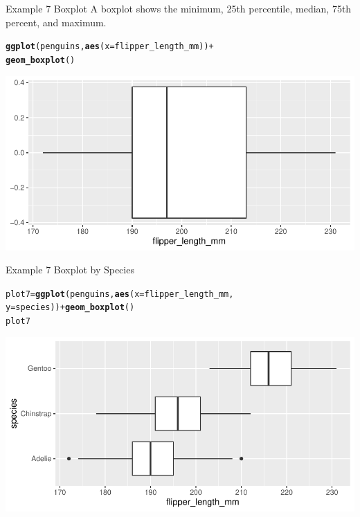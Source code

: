 \documentclass{beamer}\usepackage[]{graphicx}\usepackage[]{color}
\makeatletter
\newcommand{\hlopt}[1]{\textcolor[rgb]{0,0,0}{#1}}%
\newcommand{\hlstd}[1]{\textcolor[rgb]{0.345,0.345,0.345}{#1}}%
\newcommand{\hlkwb}[1]{\textcolor[rgb]{0.69,0.353,0.396}{#1}}%
\newcommand{\hlkwc}[1]{\textcolor[rgb]{0.333,0.667,0.333}{#1}}%
\newcommand{\hlkwd}[1]{\textcolor[rgb]{0.737,0.353,0.396}{\textbf{#1}}}%
\newenvironment{kframe}{%
 \def\at@end@of@kframe{}%
 \ifinner\ifhmode%
  \def\at@end@of@kframe{\end{minipage}}%
  \begin{minipage}{\columnwidth}%
 \fi\fi%
 \def\FrameCommand##1{\hskip\@totalleftmargin \hskip-\fboxsep
 \colorbox{shadecolor}{##1}\hskip-\fboxsep
     \hskip-\linewidth \hskip-\@totalleftmargin \hskip\columnwidth}%
 \MakeFramed {\advance\hsize-\width
   \@totalleftmargin\z@ \linewidth\hsize
   \@setminipage}}%
 {\par\unskip\endMakeFramed%
 \at@end@of@kframe}
\newenvironment{knitrout}{}{} %
\makeatother
\begin{document}
\begin{frame}[fragile]{Example 7 Boxplot}
A boxplot shows the minimum, 25th percentile, median, 75th percent, and maximum.
\begin{knitrout}
\color{fgcolor}\begin{kframe}
\begin{alltt}
\hlkwd{ggplot}\hlstd{(penguins,} \hlkwd{aes}\hlstd{(}\hlkwc{x} \hlstd{= flipper_length_mm))} \hlopt{+}
    \hlkwd{geom_boxplot}\hlstd{()}
\end{alltt}
\end{kframe}
\includegraphics[width=0.95\linewidth]{figure/unnamed-chunk-23-1} 
\end{knitrout}

\end{frame}

\begin{frame}[fragile]{Example 7 Boxplot by Species}
\begin{knitrout}
\color{fgcolor}\begin{kframe}
\begin{alltt}
\hlstd{plot7} \hlkwb{=} \hlkwd{ggplot}\hlstd{(penguins,} \hlkwd{aes}\hlstd{(}\hlkwc{x} \hlstd{= flipper_length_mm,}
    \hlkwc{y} \hlstd{= species))} \hlopt{+} \hlkwd{geom_boxplot}\hlstd{()}
\hlstd{plot7}
\end{alltt}
\end{kframe}
\includegraphics[width=0.95\linewidth]{figure/unnamed-chunk-24-1} 
\end{knitrout}

\end{frame}
\end{document}
